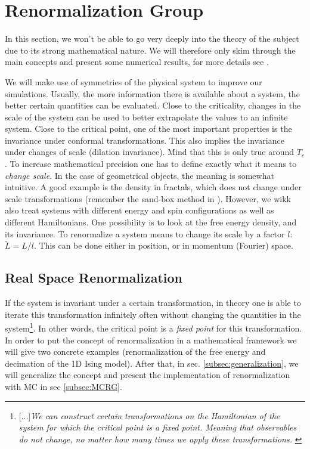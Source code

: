 

\section{Renormalization Group}

In this section, we won't be able to go very deeply into the theory of the subject due to its strong mathematical nature. We will therefore only skim through the main concepts and present some numerical results, for more details see \citet{renorm_leeuwen}.

We will make use of symmetries of the physical system to improve our simulations. Usually, the more information there is available about a system, the better certain quantities can be evaluated. Close to the criticality, changes in the scale of the system can be used to better extrapolate the values to an infinite system. Close to the critical point, one of the most important properties is the invariance under conformal transformations. This also implies the invariance under changes of scale (dilation invariance). Mind that this is only true around $T_c$. To increase mathematical precision one has to define exactly what it means to \emph{change scale}. In the case of geometrical objects, the meaning is somewhat intuitive. A good example is the density in fractals, which does not change under scale transformations (remember the sand-box method in \citet{comp_phys}). However, we wikk also treat systems with different energy and spin configurations as well as different Hamiltonians. One possibility is to look at the free energy density, and its invariance. To renormalize a system means to change its scale by a factor $l$: $\tilde{L}= L/l$.  This can be done either in position, or in momentum (Fourier) space.

\subsection{Real Space Renormalization}




If the system is invariant under a certain transformation, in theory one is able to iterate this transformation infinitely often without changing the quantities in the system\footnote{[...]\emph{We can construct certain transformations on the Hamiltonian of the system for which the critical point is a fixed point. Meaning that observables do not change, no matter how many times we apply these transformations.} \citep{wilson_renorm}}. In other words, the critical point is a \emph{fixed point} for this transformation. In order to put the concept of renormalization in a mathematical framework we will give two concrete examples (renormalization of the free energy and decimation of the 1D Ising model). After that, in sec. \ref{subsec:generalization}, we will generalize the concept and present the implementation of renormalization with MC in sec \ref{subsec:MCRG}. 


